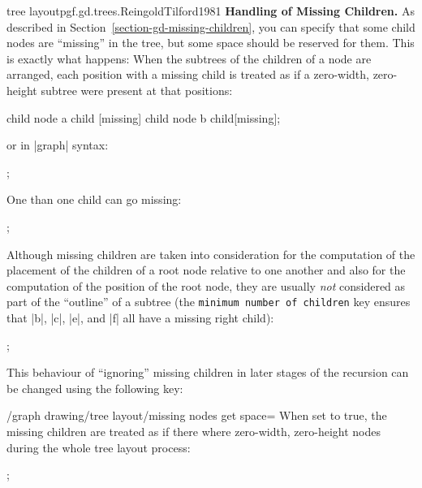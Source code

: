 \begin{gdalgorithm}{tree layout}{pgf.gd.trees.ReingoldTilford1981}
  \noindent\textbf{Handling of Missing Children.}
  As described in Section~\ref{section-gd-missing-children}, you can
  specify that some child nodes are ``missing'' in the tree, but some
  space should be reserved for them. This is exactly what happens:
  When the subtrees of the children of a node are arranged, each
  position with a missing child is treated as if a zero-width,
  zero-height subtree were present at that positions:
\begin{codeexample}[]
\tikz [tree layout, nodes={draw,circle}]
  child { node {a}
    child [missing]
    child { node {b} }
  }
  child[missing];
\end{codeexample}
  or in |graph| syntax:
\begin{codeexample}[]
\tikz {};
\end{codeexample}
  One than one child can go missing:
\begin{codeexample}[]
\tikz {};
\end{codeexample}
  Although missing children are taken into consideration for the
  computation of the placement of the children of a root node relative
  to one another and also for the computation of the position of the
  root node, they are usually \emph{not} considered as part of the
  ``outline'' of a subtree (the \texttt{minimum number of children}
  key ensures that |b|, |c|, |e|, and |f| all have a missing right
  child): 
\begin{codeexample}[]
\tikz {};
\end{codeexample}
  This behaviour of ``ignoring'' missing children in later stages of
  the recursion can be changed using the following key:
  \begin{key}{/graph drawing/tree layout/missing nodes get
      space=}
    When set to true, the missing children are treated as if there
    where zero-width, zero-height nodes during the whole tree layout
    process: 
\begin{codeexample}[]
\tikz {};
\end{codeexample}
  \end{key}
  

\end{gdalgorithm}
